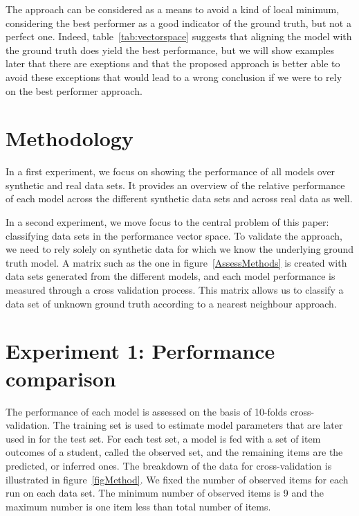 The approach can be considered as a means to avoid a kind of local minimum, considering the best performer as a good indicator of the ground truth, but not a perfect one. Indeed, table~\ref{tab:vectorspace} suggests that aligning the model with the ground truth does yield the best performance, but we will show examples later that there are exeptions and that the proposed approach is better able to avoid these exceptions that would lead to a wrong conclusion if we were to rely on the best performer approach.




\section{Methodology}

In a first experiment, we focus on showing the performance of all models over synthetic and real data sets.  It provides an overview of the relative performance of each model across the different synthetic data sets and across real data as well. 

In a second experiment, we move focus to the central problem of this paper: classifying data sets in the performance vector space.  To validate the approach, we need to rely solely on synthetic data for which we know the underlying ground truth model.  A matrix such as the one in figure~\ref{AssessMethods} is created with data sets generated from the different models, and each model performance is measured through a cross validation process.  This matrix allows us to classify a data set of unknown ground truth according to a nearest neighbour approach.  

\section{Experiment 1: Performance comparison}

The performance of each model is assessed on the basis of 10-folds cross-validation.  The training set is used to estimate model parameters that are later used in for the test set. For each test set, a model is fed with a set of item outcomes of a student, called the observed set, and the remaining items are the predicted, or inferred ones. The breakdown of the data for cross-validation is illustrated in figure~\ref{figMethod}. We fixed the number of observed items for each run on each data set. The minimum number of observed items is 9 and the maximum number is one item less than total number of items. 

